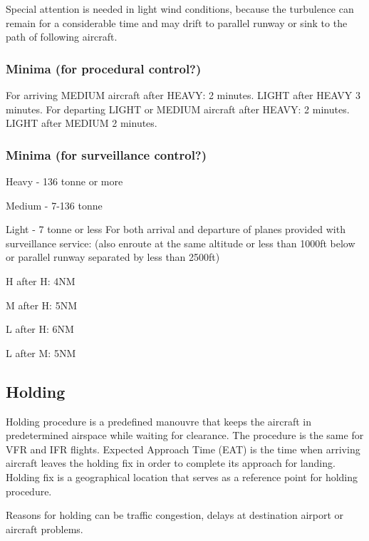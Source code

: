 Special attention is needed in light wind conditions, because the turbulence can remain for a considerable time and may drift to parallel runway or sink to the path of following aircraft.

\subsubsection{Minima (for procedural control?)}
For arriving MEDIUM aircraft after HEAVY: 2 minutes. LIGHT after HEAVY 3 minutes. \cite[Chapter 5.8.2]{doc4444}
For departing LIGHT or MEDIUM aircraft after HEAVY: 2 minutes. LIGHT after MEDIUM 2 minutes. \cite[Chapter 5.8.3]{doc4444}

\subsubsection{Minima (for surveillance control?)}
\bitem
\item Heavy - 136 tonne or more
\item Medium - 7-136 tonne
\item Light - 7 tonne or less
\eitem
For both arrival and departure of planes provided with surveillance service: (also enroute at the same altitude or less than 1000ft below or parallel runway separated by less than 2500ft)
\bitem
\item H after H: 4NM
\item M after H: 5NM
\item L after H: 6NM
\item L after M: 5NM
\eitem
\cite[Chapter 8.7.3]{doc4444}

\subsection{Holding}
Holding procedure is a predefined manouvre that keeps the aircraft in predetermined airspace while waiting for clearance. The procedure is the same for VFR and IFR flights.
Expected Approach Time (EAT) is the time when arriving aircraft leaves the holding fix in order to complete its approach for landing. Holding fix is a geographical location that serves as a reference point for holding procedure.
\cite[Chapter 6.5.8]{doc4444}

Reasons for holding can be traffic congestion, delays at destination airport or aircraft problems.

